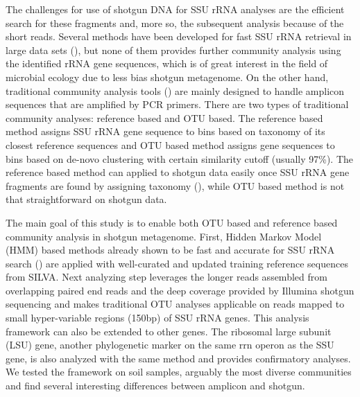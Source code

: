 \documentclass[12pt]{article}
\begin{document}
  The challenges for use of shotgun DNA for SSU rRNA analyses are the efficient search for these fragments and, more so, the subsequent analysis because of the short reads. Several methods have been developed for fast SSU rRNA retrieval in large data sets (\cite{ribopicker,metarna,rrnaselector,metaxa}), but none of them provides further community analysis using the identified rRNA gene sequences, which is of great interest in the field of microbial ecology due to less bias shotgun metagenome. On the other hand, traditional community analysis tools (\cite{rdp2009,mothur,qiime}) are mainly designed to handle amplicon sequences that are amplified by PCR primers. There are two types of traditional community analyses: reference based and OTU based. The reference based method assigns SSU rRNA gene sequence to bins based on taxonomy of its closest reference sequences and OTU based method assigns gene sequences to bins based on de-novo clustering with certain similarity cutoff (usually 97\%). The reference based method can applied to shotgun data easily once SSU rRNA gene fragments are found by assigning taxonomy (\cite{rdpclassifier}), while OTU based method is not that straightforward on shotgun data.

  The main goal of this study is to enable both OTU based and reference based community analysis in shotgun metagenome. First, Hidden Markov Model (HMM) based methods already shown to be fast and accurate for SSU rRNA search (\cite{metarna,rrnaselector,metaxa}) are applied with well-curated and updated training reference sequences from SILVA. Next analyzing step leverages the longer reads assembled from overlapping paired end reads and the deep coverage provided by Illumina shotgun sequencing and makes traditional OTU analyses applicable on reads mapped to small hyper-variable regions (150bp) of SSU rRNA genes. This analysis framework can also be extended to other genes. The ribosomal large subunit (LSU) gene, another phylogenetic marker on the same rrn operon as the SSU gene, is also analyzed with the same method and provides confirmatory analyses. We tested the framework on soil samples, arguably the most diverse communities and find several interesting differences between amplicon and shotgun.
\end{document}
